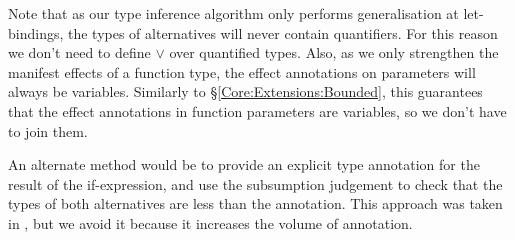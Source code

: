 
\bigskip
Note that as our type inference algorithm only performs generalisation at let-bindings, the types of alternatives will never contain quantifiers. For this reason we don't need to define $\lor$ over quantified types. Also, as we only strengthen the manifest effects of a function type, the effect annotations on parameters will always be variables. Similarly to \S\ref{Core:Extensions:Bounded}, this guarantees that the effect annotations in function parameters are variables, so we don't have to join them.

An alternate method would be to provide an explicit type annotation for the result of the if-expression, and use the subsumption judgement to check that the types of both alternatives are less than the annotation. This approach was taken in \cite{nielson:from-cml-to-its-process-algebra}, but we avoid it because it increases the volume of annotation.
